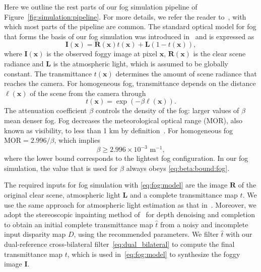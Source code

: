 \documentclass[twocolumn]{svjour3}          \smartqed  \usepackage{graphicx}
\begin{document}
Here we outline the rest parts of our fog simulation pipeline of Figure~\ref{fig:simulation:pipeline}. For more details, we refer the reader to~\cite{SFSU_synthetic}, with which most parts of the pipeline are common. The standard optical model for fog that forms the basis of our fog simulation was introduced in~\cite{Koschmieder:optical:model} and is expressed as
\begin{equation} \label{eq:fog:model}
\mathbf{I}(\mathbf{x}) = \mathbf{R}(\mathbf{x})t(\mathbf{x}) + \mathbf{L}(1 - t(\mathbf{x})),
\end{equation}
where $\mathbf{I}(\mathbf{x})$ is the observed foggy image at pixel $\mathbf{x}$, $\mathbf{R}(\mathbf{x})$ is the clear scene radiance and $\mathbf{L}$ is the atmospheric light, which is assumed to be globally constant. The transmittance $t(\mathbf{x})$ determines the amount of scene radiance that reaches the camera. For homogeneous fog, transmittance depends on the distance $\ell(\mathbf{x})$ of the scene from the camera through
\begin{equation} \label{eq:transmittance}
t(\mathbf{x}) = \exp\left(-\beta\ell(\mathbf{x})\right).
\end{equation}
The attenuation coefficient $\beta$ controls the density of the fog: larger values of $\beta$ mean denser fog. Fog decreases the meteorological optical range (MOR), also known as visibility, to less than 1 km by definition~\cite{Federal:meteorological:handbook}. For homogeneous fog $\text{MOR}=2.996/\beta$, which implies
\begin{equation} \label{eq:beta:bound:fog}
\beta \geq 2.996\times{}10^{-3}{\text{ m}}^{-1},
\end{equation}
where the lower bound corresponds to the lightest fog configuration. In our fog simulation, the value that is used for $\beta$ always obeys \eqref{eq:beta:bound:fog}.

The required inputs for fog simulation with \eqref{eq:fog:model} are the image $\mathbf{R}$ of the original clear scene, atmospheric light $\mathbf{L}$ and a complete transmittance map $t$. We use the same approach for atmospheric light estimation as that in~\cite{SFSU_synthetic}. Moreover, we adopt the stereoscopic inpainting method of~\cite{SFSU_synthetic} for depth denoising and completion to obtain an initial complete transmittance map $\hat{t}$ from a noisy and incomplete input disparity map $D$, using the recommended parameters. We filter $\hat{t}$ with our dual-reference cross-bilateral filter~\eqref{eq:dual_bilateral} to compute the final transmittance map $t$, which is used in~\eqref{eq:fog:model} to synthesize the foggy image $\mathbf{I}$.
\end{document}
